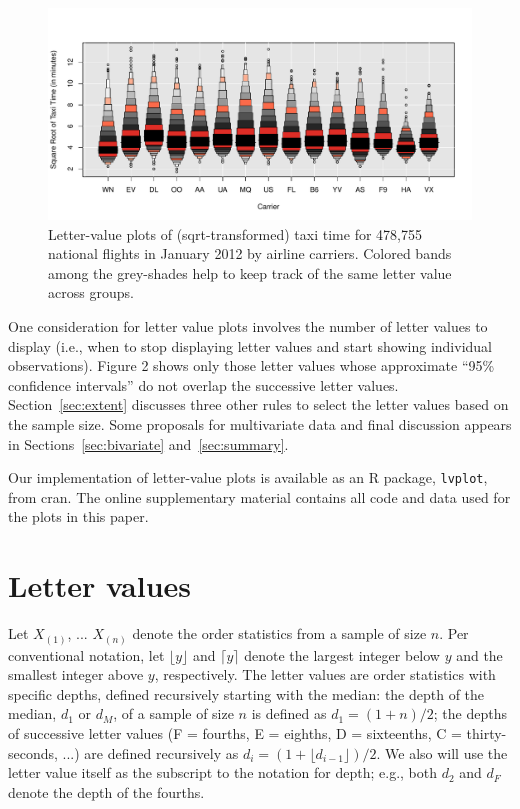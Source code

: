 \documentclass[12pt,oneside]{article}
\begin{document}
\begin{figure}[hbtp]
  \centering
  \includegraphics[width=\linewidth]{taxi-lv}

  \caption{Letter-value plots of (sqrt-transformed) taxi time for 478,755 national flights in January 2012 by airline carriers. Colored bands among the grey-shades help to keep track of the same letter value across groups.}

  \label{fig:taxi-lv} 
\end{figure}

One consideration for letter value plots involves the number of letter values to display (i.e., when to stop displaying letter values and start showing individual observations). Figure 2 shows only those letter values whose approximate ``95\% confidence intervals'' do not overlap the successive letter values. Section~\ref{sec:extent} discusses three other rules to select the letter values based on the sample size. Some proposals for multivariate data and final discussion appears in Sections~\ref{sec:bivariate} and~\ref{sec:summary}.

Our implementation of letter-value plots is available as an R package, \texttt{lvplot}, from {\sc cran}. The online supplementary material contains all code and data used for the plots in this paper.

\section{Letter values}
\label{sec:letter-values}

Let $X_{(1)}$, ... $X_{(n)}$ denote the order statistics from a sample of size $n$. Per conventional notation, let $\lfloor y \rfloor$ and $\lceil y \rceil$ denote the largest integer below $y$ and the smallest integer above $y$, respectively. The letter values are  order statistics with specific depths, defined recursively starting with the median:
the depth of the median, $d_1$ or $d_M$, of a sample of size $n$ is defined as $d_1 = (1 + n )/2$; the depths of successive letter values (F = fourths, E = eighths, D = sixteenths, C = thirty-seconds, ...) are defined recursively as $d_i = (1 + \lfloor d_{i-1} \rfloor)/2$. We also will use the letter value itself as the subscript to the notation for depth; e.g., both $d_2$ and $d_F$ denote the depth of the fourths. 
\end{document}
